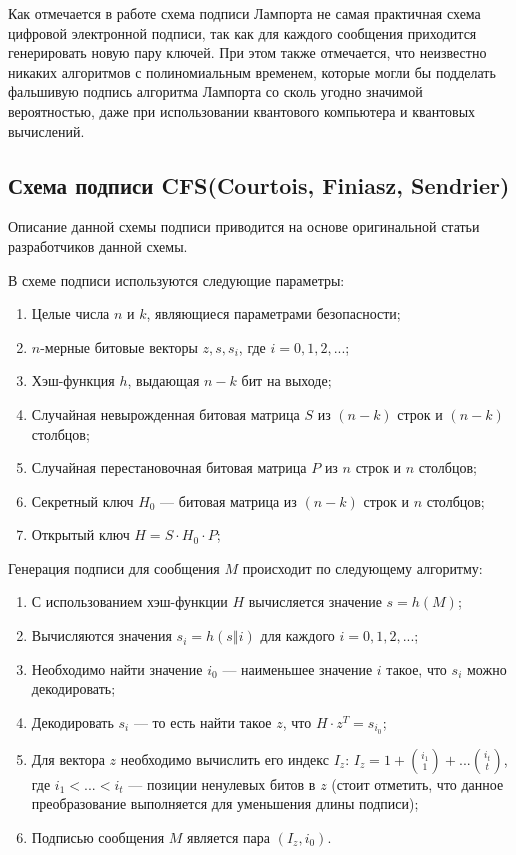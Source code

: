 \documentclass{./civarticle}
\begin{document}
Как отмечается в работе \cite{lamport} схема подписи Лампорта не самая практичная схема цифровой электронной подписи, так как для каждого сообщения приходится генерировать новую пару ключей. При этом также отмечается, что неизвестно никаких алгоритмов с полиномиальным временем, которые могли бы подделать фальшивую подпись алгоритма Лампорта со сколь угодно значимой вероятностью, даже при использовании квантового компьютера и квантовых вычислений.

\subsection{Схема подписи CFS(Courtois, Finiasz, Sendrier)}

Описание данной схемы подписи приводится на основе оригинальной статьи \cite{cfs} разработчиков данной схемы.

В схеме подписи используются следующие параметры:

\begin{enumerate}
    \item Целые числа $n$ и $k$, являющиеся параметрами безопасности;
    \item $n$-мерные битовые векторы $z, s, s_i$, где $i = 0, 1, 2, ...$;
    \item Хэш-функция $h$, выдающая $n-k$ бит на выходе;
    \item Случайная невырожденная битовая матрица $S$ из $(n - k)$ строк и $(n - k)$ столбцов;
    \item Случайная перестановочная битовая матрица $P$ из $n$ строк и $n$ столбцов;
    \item Секретный ключ $H_0$ --- битовая матрица из $(n-k)$ строк и $n$ столбцов;
    \item Открытый ключ $H = S \cdot H_0 \cdot P$;
\end{enumerate}

Генерация подписи для сообщения $M$ происходит по следующему алгоритму:

\begin{enumerate}
    \item С использованием хэш-функции $H$ вычисляется значение $s = h(M)$;
    \item Вычисляются значения $s_i = h(s \mathbin\Vert i)$ для каждого $i = 0, 1, 2, ...$;
    \item Необходимо найти значение $i_0$ --- наименьшее значение $i$ такое, что $s_i$ можно декодировать;
    \item Декодировать $s_i$ --- то есть найти такое $z$, что $H \cdot z^{T} = s_{i_0}$;
    \item Для вектора $z$ необходимо вычислить его индекс $I_z$: $I_z = 1 + \binom{i_1}{1} + ... \binom{i_t}{t}$, где $i_1 < ... < i_t$ --- позиции ненулевых битов в $z$ (стоит отметить, что данное преобразование выполняется для уменьшения длины подписи);
    \item Подписью сообщения $M$ является пара $(I_z, i_0)$.
\end{enumerate}
\end{document}
